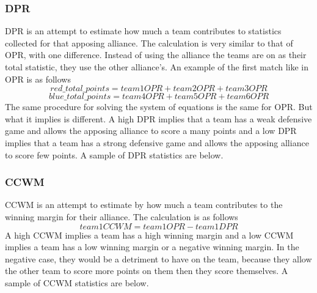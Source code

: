 \documentclass{article}
\begin{document}
\subsubsection{DPR}
\par
DPR is an attempt to estimate how much a team contributes to statistics collected for that apposing alliance. The calculation is very similar to that of OPR, with one difference. Instead of using the alliance the teams are on as their total statistic, they use the other alliance's. An example of the first match like in OPR is as follows
$$red\_total\_points = team1OPR + team2OPR + team3OPR$$
$$blue\_total\_points = team4OPR + team5OPR + team6OPR$$
The same procedure for solving the system of equations is the same for OPR. But what it implies is different. A high DPR implies that a team has a weak defensive game and allows the apposing alliance to score a many points and a low DPR implies that a team has a strong defensive game and allows the apposing alliance to score few points. A sample of DPR statistics are below. 

\begin{table}[H]
\caption{Sample Data From DPR Statistics Calculation}
\centering
{}
\label{table:DPR}
\end{table}

\subsubsection{CCWM}
\par
CCWM is an attempt to estimate by how much a team contributes to the winning margin for their alliance. The calculation is as follows
$$team1CCWM = team1OPR - team1DPR$$
A high CCWM implies a team has a high winning margin and a low CCWM implies a team has a low winning margin or a negative winning margin. In the negative case, they would be a detriment to have on the team, because they allow the other team to score more points on them then they score themselves. A sample of CCWM statistics are below.
\end{document}
